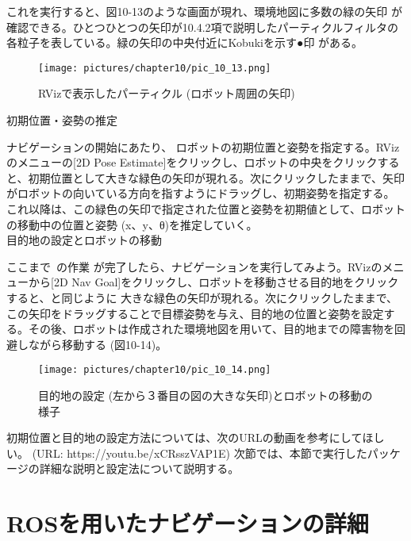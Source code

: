 これを実行すると、図10-13のような画面が現れ、環境地図に多数の緑の矢印  が確認できる。ひとつひとつの矢印が10.4.2項で説明したパーティクルフィルタの各粒子を表している。緑の矢印の中央付近にKobukiを示す●印  がある。

\begin{figure}[htp]
  \centering
  \texttt{[image: pictures/chapter10/pic\_10\_13.png]}
  \caption{RVizで表示したパーティクル (ロボット周囲の矢印)}
\end{figure}

\circled{\thenum} 初期位置・姿勢の推定

ナビゲーションの開始にあたり、 ロボットの初期位置と姿勢を指定する。RVizのメニューの[2D Pose Estimate]をクリックし、ロボットの中央をクリックすると、初期位置として大きな緑色の矢印が現れる。次にクリックしたままで、矢印がロボットの向いている方向を指すようにドラッグし、初期姿勢を指定する。   これ以降は、この緑色の矢印で指定された位置と姿勢を初期値として、ロボットの移動中の位置と姿勢 (x、y、θ)を推定していく。\\

\circled{\thenum} 目的地の設定とロボットの移動

ここまで~の作業  が完了したら、ナビゲーションを実行してみよう。RVizのメニューから[2D Nav Goal]をクリックし、ロボットを移動させる目的地をクリックすると、と同じように  大きな緑色の矢印が現れる。次にクリックしたままで、この矢印をドラッグすることで目標姿勢を与え、目的地の位置と姿勢を設定する。その後、ロボットは作成された環境地図を用いて、目的地までの障害物を回避しながら移動する (図10-14)。\\

\begin{figure}[htp]
  \centering
  \texttt{[image: pictures/chapter10/pic\_10\_14.png]}
  \caption{目的地の設定 (左から３番目の図の大きな矢印)とロボットの移動の様子}
\end{figure}

初期位置と目的地の設定方法については、次のURLの動画を参考にしてほしい。 (URL: https://youtu.be/xCRsszVAP1E)
次節では、本節で実行したパッケージの詳細な説明と設定法について説明する。

\section{ROSを用いたナビゲーションの詳細}

